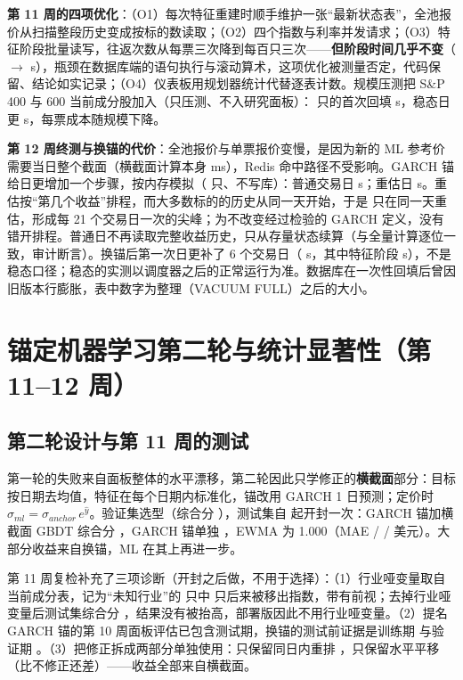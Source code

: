 \documentclass[11pt]{ctexart}
\begin{document}
\textbf{第 11 周的四项优化}：（O1）每次特征重建时顺手维护一张“最新状态表”，全池报价从扫描整段历史变成按标的数读取；（O2）四个指数与利率并发请求；（O3）特征阶段批量读写，往返次数从每票三次降到每百只三次——\textbf{但阶段时间几乎不变}（\rnFeatBeforeS{} $\to$ \rnFeatAfterS{} s），瓶颈在数据库端的语句执行与滚动算术，这项优化被测量否定，代码保留、结论如实记录；（O4）仪表板用规划器统计代替逐表计数。规模压测把 S\&P 400 与 600 当前成分股加入（只压测、不入研究面板）：\rnScaleN{} 只的首次回填 \rnScaleBackfillS{} s，稳态日更 \rnScaleSteadyS{} s，每票成本随规模下降。

\textbf{第 12 周终测与换锚的代价}：全池报价与单票报价变慢，是因为新的 ML 参考价需要当日整个截面（横截面计算本身 \rnFinalXsMs{} ms），Redis 命中路径不受影响。GARCH 锚给日更增加一个步骤，按内存模拟（\rnGarchTickers{} 只、不写库）：普通交易日 \rnGarchOrdS{} s；重估日 \rnGarchRefitS{} s。重估按“第几个收益”排程，而大多数标的的历史从同一天开始，于是 \rnGarchRefits{} 只在同一天重估，形成每 21 个交易日一次的尖峰；为不改变经过检验的 GARCH 定义，没有错开排程。普通日不再读取完整收益历史，只从存量状态续算（与全量计算逐位一致，审计断言）。换锚后第一次日更补了 6 个交易日（\rnCatchupS{} s，其中特征阶段 \rnCatchupFeatS{} s），不是稳态口径；稳态的实测以调度器之后的正常运行为准。数据库在一次性回填后曾因旧版本行膨胀，表中数字为整理（VACUUM FULL）之后的大小。

\section{锚定机器学习第二轮与统计显著性（第 11--12 周）}\label{sec:ml2}
\subsection{第二轮设计与第 11 周的测试}
第一轮的失败来自面板整体的水平漂移，第二轮因此只学修正的\textbf{横截面}部分：目标按日期去均值，特征在每个日期内标准化，锚改用 GARCH 1 日预测；定价时 $\sigma_{ml}=\sigma_{anchor}\,e^{\hat y}$。验证集选型（综合分 \rnElevenVal），测试集自 \rnElevenTestStart{} 起开封一次：GARCH 锚加横截面 GBDT 综合分 \rnElevenTestMl，GARCH 锚单独 \rnElevenTestG，EWMA 为 1.000（MAE \rnElevenMaeMl{} / \rnElevenMaeG{} / \rnElevenMaeE{} 美元）。大部分收益来自换锚，ML 在其上再进一步。

第 11 周复检补充了三项诊断（开封之后做，不用于选择）：（1）行业哑变量取自当前成分表，记为“未知行业”的 \rnUnknownN{} 只中 \rnUnknownRemoved{} 只后来被移出指数，带有前视；去掉行业哑变量后测试集综合分 \rnNoDummyTest，结果没有被抬高，部署版因此不用行业哑变量。（2）提名 GARCH 锚的第 10 周面板评估已包含测试期，换锚的测试前证据是训练期 \rnGTrain{} 与验证期 \rnGVal。（3）把修正拆成两部分单独使用：只保留同日内重排 \rnCsOnly，只保留水平平移 \rnLevelOnly{}（比不修正还差）——收益全部来自横截面。
\end{document}
